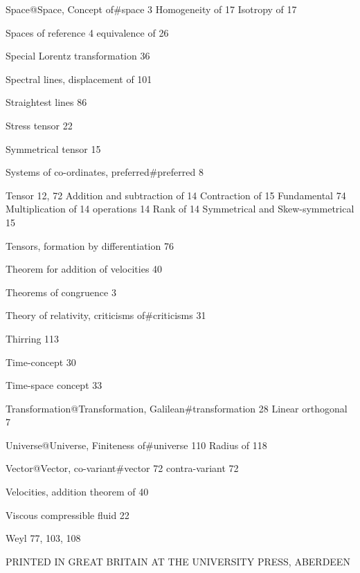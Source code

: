 \documentclass[12pt]{book}[2005/09/16]
\renewcommand{\cleardoublepage}{\clearpage}
\newenvironment{CenterPage}{%
  \thispagestyle{empty}%
  \null\vfill%
  \begin{center}
  }{%
  \end{center}
  \vfill%
}
\newcommand{\PageSep}[1]{\ignorespaces}
\begin{document}
Space@{Space, Concept of}#space 3 %
  Homogeneity of 17 %
  Isotropy of 17

Spaces of reference 4
  equivalence of 26

Special Lorentz transformation 36

Spectral lines, displacement of 101

Straightest lines 86

Stress tensor 22

Symmetrical tensor 15

Systems of co-ordinates, preferred#preferred 8


Tensor 12, 72
  Addition and subtraction of 14
  Contraction of 15
  Fundamental 74
  Multiplication of 14
  operations 14 %
  Rank of 14
  Symmetrical and Skew-symmetrical 15

Tensors, formation by differentiation 76

Theorem for addition of velocities 40

Theorems of congruence 3

Theory of relativity, criticisms of#criticisms 31

Thirring 113

Time-concept 30

Time-space concept 33

Transformation@{Transformation, Galilean}#transformation 28
  Linear orthogonal 7

Universe@{Universe, Finiteness of}#universe 110 %
  Radius of 118 %

Vector@{Vector, co-variant}#vector 72
  contra-variant 72

Velocities, addition theorem of 40

Viscous compressible fluid 22

Weyl 77, 103, 108
\fi %
\PageSep{124}
\cleardoublepage
\newpage
\begin{CenterPage}
\scriptsize
PRINTED IN GREAT BRITAIN AT THE UNIVERSITY PRESS, ABERDEEN
\end{CenterPage}

\end{document}
